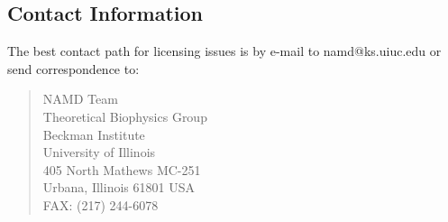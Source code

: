 \subsection*{Contact Information}

The best contact path for licensing issues is by e-mail to namd@ks.uiuc.edu 
or send correspondence to:
\begin{verse}
                             NAMD Team\\
                             Theoretical Biophysics Group\\
                             Beckman Institute\\
                             University of Illinois\\
                             405 North Mathews MC-251\\
                             Urbana, Illinois 61801 USA\\
                             FAX: (217) 244-6078
\end{verse}


